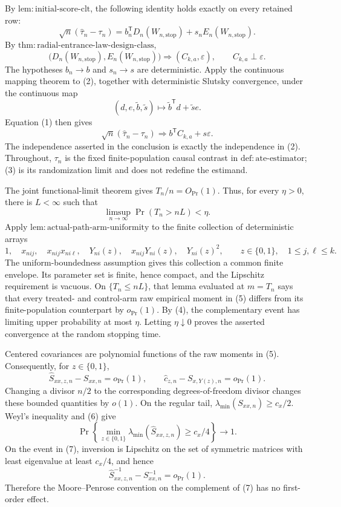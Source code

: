 By \(\mathrm{lem{:}initial\mbox{-}score\mbox{-}clt}\), the following identity holds exactly on every retained row:
\[
 \sqrt n(\widehat\tau_n-\tau_n)
 =b_n^{\mathsf T}D_n(W_{n,\mathrm{stop}})
  +s_nE_n(W_{n,\mathrm{stop}}). \tag{1}
\]
By \(\mathrm{thm{:}radial\mbox{-}entrance\mbox{-}law\mbox{-}design\mbox{-}class}\),
\[
 \bigl(D_n(W_{n,\mathrm{stop}}),E_n(W_{n,\mathrm{stop}})\bigr)
 \Rightarrow(C_{k,a},\varepsilon),
 \qquad C_{k,a}\perp\varepsilon. \tag{2}
\]
The hypotheses \(b_n\to b\) and \(s_n\to s\) are deterministic.  Apply the continuous mapping theorem to (2), together with deterministic Slutsky convergence, under the continuous map
\[
 (d,e,\widetilde b,\widetilde s)
 \longmapsto \widetilde b^{\mathsf T}d+\widetilde s e.
\]
Equation (1) then gives
\[
 \sqrt n(\widehat\tau_n-\tau_n)
 \Rightarrow b^{\mathsf T}C_{k,a}+s\varepsilon. \tag{3}
\]
The independence asserted in the conclusion is exactly the independence in (2).  Throughout, \(\tau_n\) is the fixed finite-population causal contrast in \(\mathrm{def{:}ate\mbox{-}estimator}\); (3) is its randomization limit and does not redefine the estimand.

The joint functional-limit theorem gives \(T_n/n=O_{\Pr}(1)\).  Thus, for every \(\eta>0\), there is \(L<\infty\) such that
\[
 \limsup_{n\to\infty}\Pr(T_n>nL)<\eta. \tag{4}
\]
Apply \(\mathrm{lem{:}actual\mbox{-}path\mbox{-}arm\mbox{-}uniformity}\) to the finite collection of deterministic arrays
\[
 1,\quad x_{nij},\quad x_{nij}x_{ni\ell},\quad
 Y_{ni}(z),\quad x_{nij}Y_{ni}(z),\quad Y_{ni}(z)^2,
 \qquad z\in\{0,1\},\quad 1\le j,\ell\le k. \tag{5}
\]
The uniform-boundedness assumption gives this collection a common finite envelope.  Its parameter set is finite, hence compact, and the Lipschitz requirement is vacuous.  On \(\{T_n\le nL\}\), that lemma evaluated at \(m=T_n\) says that every treated- and control-arm raw empirical moment in (5) differs from its finite-population counterpart by \(o_{\Pr}(1)\).  By (4), the complementary event has limiting upper probability at most \(\eta\).  Letting \(\eta\downarrow0\) proves the asserted convergence at the random stopping time.

Centered covariances are polynomial functions of the raw moments in (5).  Consequently, for \(z\in\{0,1\}\),
\[
 \widehat S_{xx,z,n}-S_{xx,n}=o_{\Pr}(1),
 \qquad
 \widehat c_{z,n}-S_{x,Y(z),n}=o_{\Pr}(1). \tag{6}
\]
Changing a divisor \(n/2\) to the corresponding degrees-of-freedom divisor changes these bounded quantities by \(o(1)\).  On the regular tail, \(\lambda_{\min}(S_{xx,n})\ge c_x/2\).  Weyl's inequality and (6) give
\[
 \Pr\!\left\{\min_{z\in\{0,1\}}
 \lambda_{\min}(\widehat S_{xx,z,n})\ge c_x/4\right\}\longrightarrow1. \tag{7}
\]
On the event in (7), inversion is Lipschitz on the set of symmetric matrices with least eigenvalue at least \(c_x/4\), and hence
\[
 \widehat S_{xx,z,n}^{-1}-S_{xx,n}^{-1}=o_{\Pr}(1).
\]
Therefore the Moore--Penrose convention on the complement of (7) has no first-order effect.

